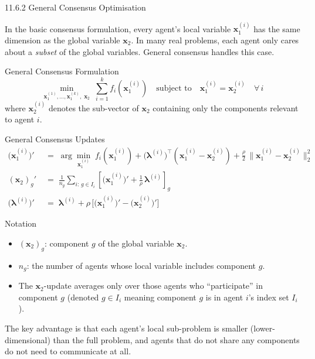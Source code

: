 \documentclass[aspectratio=169,10pt]{beamer}
\newcommand{\bx}{\mathbf{x}}
\newcommand{\blam}{\boldsymbol{\lambda}}
\begin{document}
\begin{frame}[allowframebreaks]{11.6.2 General Consensus Optimisation}

  In the basic consensus formulation, every agent's local variable
  $\bx_1^{(i)}$ has the same dimension as the global variable $\bx_2$.
  In many real problems, each agent only cares about a \emph{subset} of
  the global variables.  General consensus handles this case.

  \begin{block}{General Consensus Formulation}
    \[
      \min_{\bx_1^{(1)}, \ldots, \bx_1^{(k)},\; \bx_2}\;
      \sum_{i=1}^k f_i\!\left(\bx_1^{(i)}\right)
      \quad \text{subject to} \quad
      \bx_1^{(i)} = \bx_2^{(i)} \quad \forall\, i
    \]
    where $\bx_2^{(i)}$ denotes the sub-vector of $\bx_2$ containing
    only the components relevant to agent $i$.
  \end{block}

  \begin{block}{General Consensus Updates}
    \begin{align*}
      \bigl(\bx_1^{(i)}\bigr)' &\;=\; \arg\min_{\bx_1^{(i)}}\;
        f_i(\bx_1^{(i)})
        + \bigl(\blam^{(i)}\bigr)^\top\!\left(\bx_1^{(i)} - \bx_2^{(i)}\right)
        + \frac{\rho}{2}\,\|\bx_1^{(i)} - \bx_2^{(i)}\|_2^2 \\[6pt]
      (\bx_2)_g' &\;=\; \frac{1}{n_g} \sum_{i:\, g \in I_i}
        \left[\bigl(\bx_1^{(i)}\bigr)' + \frac{1}{\rho}\,\blam^{(i)}\right]_g \\[6pt]
      \bigl(\blam^{(i)}\bigr)' &\;=\; \blam^{(i)}
        + \rho\,\bigl[\bigl(\bx_1^{(i)}\bigr)' - \bigl(\bx_2^{(i)}\bigr)'\bigr]
    \end{align*}
  \end{block}

  \begin{block}{Notation}
    \begin{itemize}
      \item $(\bx_2)_g$: component $g$ of the global variable $\bx_2$.
      \item $n_g$: the number of agents whose local variable includes
            component $g$.
      \item The $\bx_2$-update averages only over those agents who
            ``participate'' in component $g$ (denoted $g \in I_i$ meaning
            component $g$ is in agent $i$'s index set $I_i$).
    \end{itemize}
  \end{block}

  The key advantage is that each agent's local sub-problem is smaller
  (lower-dimensional) than the full problem, and agents that do not share
  any components do not need to communicate at all.

\end{frame}
\end{document}
